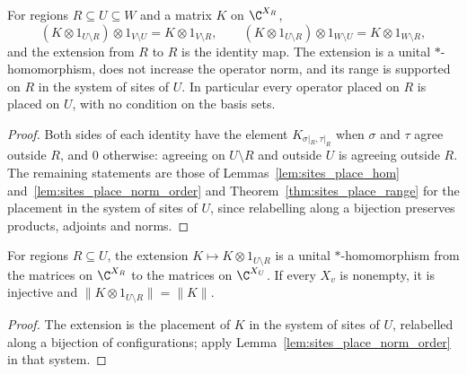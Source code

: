 \begin{lemma}
    \label{lem:sites_subregion_place}
    \leanok
    For regions $R\subseteq U\subseteq W$ and a matrix $K$ on $\C^{X_R}$,
    \[
        (K\otimes1_{U\setminus R})\otimes1_{V\setminus U}=K\otimes1_{V\setminus R},
        \qquad
        (K\otimes1_{U\setminus R})\otimes1_{W\setminus U}=K\otimes1_{W\setminus R},
    \]
    and the extension from $R$ to $R$ is the identity map. The extension is a unital
    $*$-homomorphism, does not increase the operator norm, and its range is supported on
    $R$ in the system of sites of $U$. In particular every operator placed on $R$ is
    placed on $U$, with no condition on the basis sets.
\end{lemma}
\begin{proof}\leanok
    Both sides of each identity have the element $K_{\sigma|_R,\tau|_R}$ when $\sigma$
    and $\tau$ agree outside $R$, and $0$ otherwise: agreeing on $U\setminus R$ and
    outside $U$ is agreeing outside $R$. The remaining statements are those of
    Lemmas~\ref{lem:sites_place_hom} and~\ref{lem:sites_place_norm_order} and
    Theorem~\ref{thm:sites_place_range} for the placement in the system of sites of
    $U$, since relabelling along a bijection preserves products, adjoints and norms.
\end{proof}

\begin{lemma}
    \label{lem:sites_subregion_place_isometry}
    \leanok
    For regions $R\subseteq U$, the extension $K\mapsto K\otimes1_{U\setminus R}$ is a
    unital $*$-homomorphism from the matrices on $\C^{X_R}$ to the matrices on
    $\C^{X_U}$. If every $X_v$ is nonempty, it is injective and
    $\lVert K\otimes1_{U\setminus R}\rVert=\lVert K\rVert$.
\end{lemma}
\begin{proof}\leanok
    The extension is the placement of $K$ in the system of sites of $U$, relabelled along a
    bijection of configurations; apply Lemma~\ref{lem:sites_place_norm_order} in that
    system.
\end{proof}

